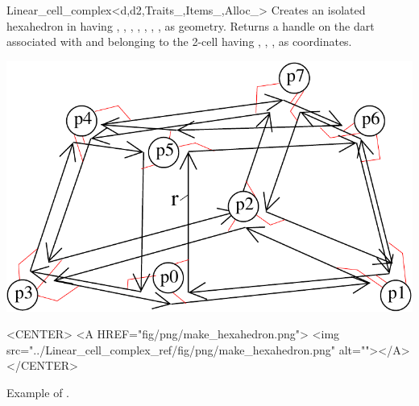 \begin{ccRefClass}{Linear_cell_complex<d,d2,Traits_,Items_,Alloc_>}
{Creates an isolated hexahedron in  having , ,
, , , , ,  as geometry.
  Returns a handle on the dart associated with  and
  belonging to the 2-cell having , , , 
  as coordinates.
}
\def\LargFig{.4\textwidth}
  \begin{ccTexOnly}
    \begin{center}
      \includegraphics[width=\LargFig]{Linear_cell_complex_ref/fig/pdf/make_hexahedron}
    \end{center}
  \end{ccTexOnly}
  \begin{ccHtmlOnly}
    <CENTER>
    <A HREF="fig/png/make_hexahedron.png">
        <img src="../Linear_cell_complex_ref/fig/png/make_hexahedron.png" alt=""></A>
    </CENTER>
    \end{ccHtmlOnly}
    \centerline{Example of .}

\ccSeeAlso
{}\\
\\
\\
\\
\\
\\

\end{ccRefClass}
\ccRefPageEnd
